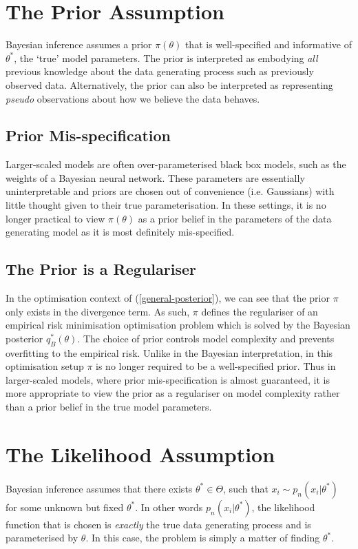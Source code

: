 \documentclass[twoside,11pt]{article}
\begin{document}
\section{The Prior Assumption} \label{sec:prior}
Bayesian inference assumes a prior $\pi(\theta)$ that is well-specified and informative of $\theta^*$, the `true' model parameters. The prior is interpreted as embodying \textit{all} previous knowledge about the data generating process such as previously observed data. Alternatively, the prior can also be interpreted as representing \textit{pseudo} observations about how we believe the data behaves.
\subsection{Prior Mis-specification}
Larger-scaled models are often over-parameterised black box models, such as the weights of a Bayesian neural network. These parameters are essentially uninterpretable and priors are chosen out of convenience (i.e. Gaussians) with little thought given to their true parameterisation. In these settings, it is no longer practical to view $\pi(\theta)$ as a prior belief in the parameters of the data generating model as it is most definitely mis-specified.
\subsection{The Prior is a Regulariser}
In the optimisation context of (\ref{general-posterior}), we can see that the prior $\pi$ only exists in the divergence term. As such, $\pi$ defines the regulariser of an empirical risk minimisation optimisation problem which is solved by the Bayesian posterior $q_B^*(\theta)$. The choice of prior controls model complexity and prevents overfitting to the empirical risk. Unlike in the Bayesian interpretation, in this optimisation setup $\pi$ is no longer required to be a well-specified prior. Thus in larger-scaled models, where prior mis-specification is almost guaranteed, it is more appropriate to view the prior as a regulariser on model complexity rather than a prior belief in the true model parameters.

\section{The Likelihood Assumption}\label{sec:likelihood}

Bayesian inference assumes that there exists $\theta^* \in \Theta$, such that $x_i \sim p_n(x_i | \theta^*)$ for some unknown but fixed $\theta^*$. In other words $p_n(x_i | \theta^*)$, the likelihood function that is chosen is \textit{exactly} the true data generating process and is parameterised by $\theta$. In this case, the problem is simply a matter of finding $\theta^*$. 
\end{document}
